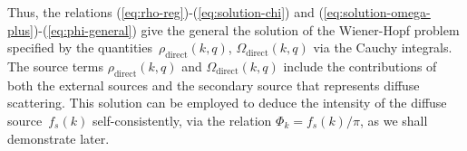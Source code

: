 \documentclass[preprint,aps,eqsecnum]{revtex4-1}
\newcommand{\dct}[1]{{#1}_\mathrm{direct}}
\begin{document}
Thus, the relations (\ref{eq:rho-reg})-(\ref{eq:solution-chi})
and (\ref{eq:solution-omega-plus})-(\ref{eq:phi-general})
give the general the solution of the Wiener-Hopf problem specified
by the quantities~$\dct{\rho}(k, q)$, $\dct{\Omega}(k, q)$ via
the Cauchy integrals. The source terms $\dct{\rho}(k, q)$
and $\dct{\Omega}(k, q)$ include the contributions of  
both the external sources and the secondary source that represents
diffuse scattering.
This solution can be employed to deduce the intensity
of the diffuse source~$f_s(k)$ self-consistently, via the relation
$\Phi_k = f_{s}(k)/\pi$, as we shall demonstrate later.
\end{document}
